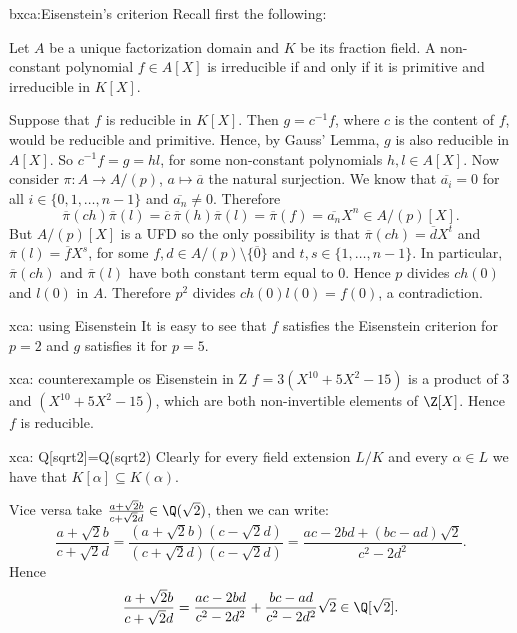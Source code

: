 \begin{sol}{bxca:Eisenstein's criterion}
Recall first the following:
\begin{lemma*}
    Let $A$ be a unique factorization domain and $K$ be its fraction field.
    A non-constant polynomial $f\in A[X]$ is irreducible if and only if it is primitive and irreducible in $K[X]$.
\end{lemma*}

    Suppose that $f$ is reducible in $K[X]$.
    Then $g=c^{-1}f$, where $c$ is the content of $f$,
    would be reducible and primitive.
    Hence, by Gauss' Lemma, $g$ is also 
    reducible in $A[X]$.
    So $c^{-1}f=g=hl$, for some non-constant polynomials $h,l\in A[X]$.
    Now consider $\pi:A\to A/(p)$, $a\mapsto \overline{a}$ the natural surjection.
    We know that $\overline{a_i}=0$ for all 
    $i\in\{0,1,\dots, n-1\}$ and $\overline{a_n}\neq 0$.
    Therefore 
    \[
    \overline{\pi}(ch)\overline{\pi}(l)=\overline{c}\:\overline{\pi}(h)\overline{\pi}(l)=\overline{\pi}(f)=\overline{a_n}X^n\in  A/(p)[X].
    \]
    But $A/(p)[X]$ is a UFD so the only possibility
    is that $\overline{\pi}(ch)=\overline{d}X^t$ and $\overline{\pi}(l)=\overline{f}X^s$, for
    some $f,d\in A/(p)\setminus\{\overline{0}\}$
    and $t,s\in\{1,\dots, n-1\}$.
    In particular, $\overline{\pi}(ch)$ and $\overline{\pi}(l)$ have both constant term 
    equal to 0.
    Hence $p$ divides $ch(0)$ and $l(0)$ in $A$.
    Therefore $p^2$ divides $ch(0)l(0)=f(0)$,
    a contradiction.
\end{sol}

\begin{sol}{xca: using Eisenstein}
It is easy to see that $f$ satisfies the Eisenstein criterion for $p=2$
and $g$ satisfies it for $p=5$. 
\end{sol}

\begin{sol}{xca: counterexample os Eisenstein in Z}
    $f=3(X^{10}+5X^2-15)$ is a product of $3$ and $(X^{10}+5X^2-15)$,
    which are both non-invertible elements of $\Z[X]$.
    Hence $f$ is reducible.
\end{sol}

\begin{sol}{xca: Q[sqrt2]=Q(sqrt2)}
Clearly for every field extension $L/K$ and 
    every $\alpha\in L$ we have that
    $K[\alpha]\subseteq K(\alpha)$.

    Vice versa take $\frac{a+\sqrt{2}b}{c+\sqrt{2}d}\in \Q(\sqrt{2})$,
    then we can write:
    \[
    \frac{a+\sqrt{2}b}{c+\sqrt{2}d}=\frac{(a+\sqrt{2}b)(c-\sqrt{2}d)}{(c+\sqrt{2}d)(c-\sqrt{2}d)}=
    \frac{ac-2bd+(bc-ad)\sqrt{2}}{c^2-2d^2}.
    \]
    Hence
    \[
    \frac{a+\sqrt{2}b}{c+\sqrt{2}d}=\frac{ac-2bd}{c^2-2d^2}+\frac{bc-ad}{c^2-2d^2}\sqrt{2}\in \Q[\sqrt{2}].
    \]
\end{sol}


